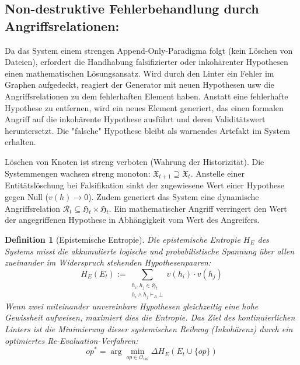 \documentclass[11pt, a4paper]{article}
\newtheorem{definition}{Definition}
\begin{document}
	\subsection{Non-destruktive Fehlerbehandlung durch Angriffsrelationen:} Da das System einem strengen Append-Only-Paradigma folgt (kein Löschen von Dateien), erfordert die Handhabung falsifizierter oder inkohärenter Hypothesen einen mathematischen Lösungsansatz. Wird durch den Linter ein Fehler im Graphen aufgedeckt, reagiert der Generator mit neuen Hypothesen usw die Angriffsrelationen zu dem fehlerhaften Element haben. Anstatt eine fehlerhafte Hypothese zu entfernen, wird ein neues Element generiert, das einen formalen Angriff auf die inkohärente Hypothese ausführt und deren Validitätswert heruntersetzt. Die "falsche" Hypothese bleibt als warnendes Artefakt im System erhalten.
	
	Löschen von Knoten ist streng verboten (Wahrung der Historizität). Die Systemmengen wachsen streng monoton: $\mathfrak{X}_{t+1} \supseteq \mathfrak{X}_t$. Anstelle einer Entitätslöschung bei Falsifikation sinkt der zugewiesene Wert einer Hypothese gegen Null ($v(h) \to 0$). Zudem generiert das System eine dynamische Angriffsrelation $\mathcal{R}_t \subseteq \mathfrak{H}_t \times \mathfrak{H}_t$. Ein mathematischer Angriff verringert den Wert der angegriffenen Hypothese in Abhängigkeit vom Wert des Angreifers.
	
	\begin{definition}[Epistemische Entropie]
		Die \emph{epistemische Entropie} $H_E$ des Systems misst die akkumulierte logische und probabilistische Spannung über allen zueinander im Widerspruch stehenden Hypothesenpaaren:
		\[
		H_E(E_t) := \sum_{\substack{h_i, h_j \in \mathfrak{H}_t \\ h_i \land h_j \vdash_{A} \bot}} v(h_i) \cdot v(h_j)
		\]
		Wenn zwei miteinander unvereinbare Hypothesen gleichzeitig eine hohe Gewissheit aufweisen, maximiert dies die Entropie. Das Ziel des kontinuierlichen Linters ist die Minimierung dieser systemischen Reibung (Inkohärenz) durch ein optimiertes Re-Evaluation-Verfahren:
		\[
		op^* = \arg\min_{op \in \mathcal{O}_{val}} \Delta H_E(E_t \cup \{op\})
		\]
	\end{definition}
	
\end{document}
